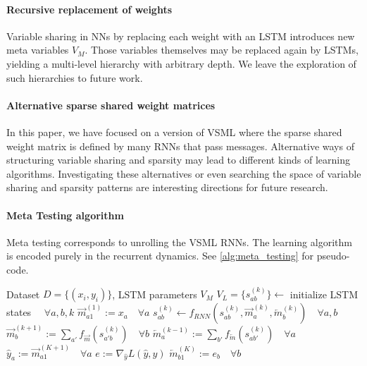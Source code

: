 \documentclass{article}
\newcommand{\principle}{VSML}
\newcommand{\approach}{VSML RNNs}
\newcommand{\fmsg}{f_{\overrightarrow m}}
\newcommand{\bmsg}{f_{\overleftarrow m}}
\newcommand{\sfmsg}{\overrightarrow m}
\newcommand{\sbmsg}{\overleftarrow m}
\begin{document}
\paragraph{Recursive replacement of weights}
Variable sharing in NNs by replacing each weight with an LSTM introduces new meta variables $V_M$.
Those variables themselves may be replaced again by LSTMs, yielding a multi-level hierarchy with arbitrary depth.
We leave the exploration of such hierarchies to future work.

\paragraph{Alternative sparse shared weight matrices}
In this paper, we have focused on a version of VSML where the sparse shared weight matrix is defined by many RNNs that pass messages.
Alternative ways of structuring variable sharing and sparsity may lead to different kinds of learning algorithms.
Investigating these alternatives or even searching the space of variable sharing and sparsity patterns are interesting directions for future research.

\paragraph{Meta Testing algorithm}
Meta testing corresponds to unrolling the {\approach}.
The learning algorithm is encoded purely in the recurrent dynamics.
See \autoref{alg:meta_testing} for pseudo-code.
\begin{algorithm}[H]
    \centering	
    \begin{algorithmic}	
        \Require Dataset $D = \{(x_i, y_i)\}$, LSTM parameters $V_M$
        \State $V_L = \{s_{ab}^{(k)}\} \leftarrow$ initialize LSTM states $\quad \forall a,b,k$
         
            \State $\sfmsg^{(1)}_{a1} := x_a \quad \forall a$ 
             
                \State $s_{ab}^{(k)} \leftarrow f_{RNN}(s_{ab}^{(k)}, \sfmsg_a^{(k)}, \sbmsg_b^{(k)}) \quad \forall a,b$ 
                \State $\sfmsg_b^{(k+1)} := \sum_{a'} \fmsg(s_{a'b}^{(k)}) \quad \forall b$ 
                \State $\sbmsg_a^{(k-1)} := \sum_{b'} \bmsg(s_{ab'}^{(k)}) \quad \forall a$ 
            \EndFor
            \State $\hat y_a := \sfmsg_{a1}^{(K+1)} \quad \forall a$ 
            \State $e := \nabla_{\hat y} L(\hat y, y)$ 
            \State $\sbmsg_{b1}^{(K)} := e_b \quad \forall b$ 
        \EndFor
    \end{algorithmic}	
    \caption{{\principle}: Meta Testing\label{alg:meta_testing}}
\end{algorithm}
\end{document}
